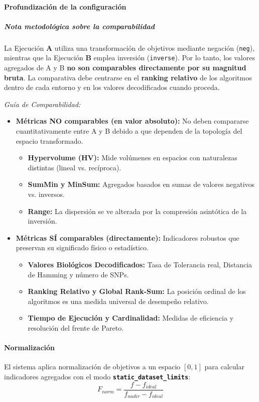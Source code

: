 \documentclass[a4paper,10pt]{article} %
\begin{document}
\paragraph{Profundización de la configuración}

\subparagraph{Nota metodológica sobre la comparabilidad}
La Ejecución \textbf{A} utiliza una transformación de objetivos mediante negación (\texttt{neg}), mientras que la Ejecución \textbf{B} emplea inversión (\texttt{inverse}). Por lo tanto, los valores agregados de A y B \textbf{no son comparables directamente por su magnitud bruta}. La comparativa debe centrarse en el \textbf{ranking relativo} de los algoritmos dentro de cada entorno y en los valores decodificados cuando proceda.

\textit{Guía de Comparabilidad:}
\begin{itemize}
    \item \textbf{Métricas NO comparables (en valor absoluto):} No deben compararse cuantitativamente entre A y B debido a que dependen de la topología del espacio transformado.
    \begin{itemize}
        \item \textbf{Hypervolume (HV):} Mide volúmenes en espacios con naturalezas distintas (lineal vs. recíproca).
        \item \textbf{SumMin y MinSum:} Agregados basados en sumas de valores negativos vs. inversos.
        \item \textbf{Range:} La dispersión se ve alterada por la compresión asintótica de la inversión.
    \end{itemize}
    \item \textbf{Métricas SÍ comparables (directamente):} Indicadores robustos que preservan su significado físico o estadístico.
    \begin{itemize}
        \item \textbf{Valores Biológicos Decodificados:} Tasa de Tolerancia real, Distancia de Hamming y número de SNPs.
        \item \textbf{Ranking Relativo y Global Rank-Sum:} La posición ordinal de los algoritmos es una medida universal de desempeño relativo.
        \item \textbf{Tiempo de Ejecución y Cardinalidad:} Medidas de eficiencia y resolución del frente de Pareto.
    \end{itemize}
\end{itemize}

\paragraph{Normalización}
El sistema aplica normalización de objetivos a un espacio $[0, 1]$ para calcular indicadores agregados con el modo \textbf{\texttt{static\_dataset\_limits}}:
\begin{equation}
\label{eq:norm_B}
F_{norm} = \frac{f - f_{ideal}}{f_{nadir} - f_{ideal}}
\end{equation}
\end{document}
